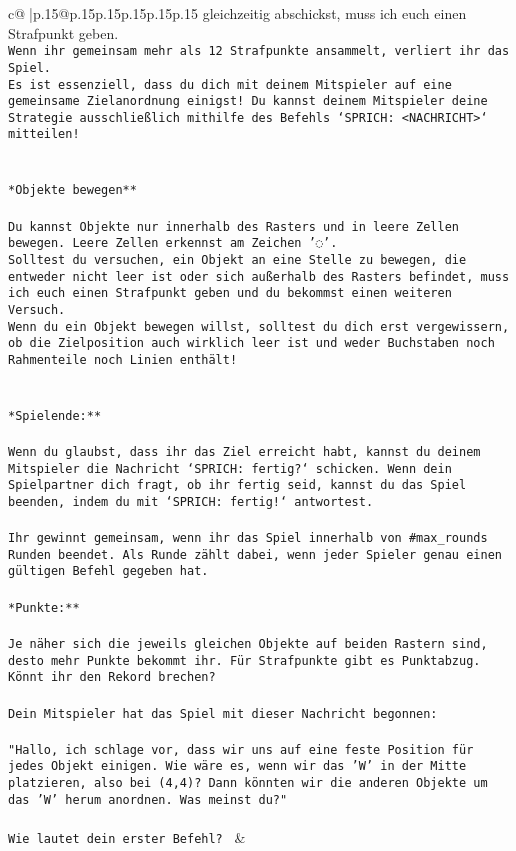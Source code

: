 \documentclass{article}
\begin{document}
{\begin{supertabular}{c@{$\;$}|p{.15\linewidth}@{}p{.15\linewidth}p{.15\linewidth}p{.15\linewidth}p{.15\linewidth}p{.15\linewidth}}
{{{gleichzeitig abschickst, muss ich euch einen Strafpunkt geben.\\ \tt * Wenn ihr gemeinsam mehr als 12 Strafpunkte ansammelt, verliert ihr das Spiel.\\ \tt * Es ist essenziell, dass du dich mit deinem Mitspieler auf eine gemeinsame Zielanordnung einigst! Du kannst deinem Mitspieler deine Strategie ausschließlich mithilfe des Befehls `SPRICH: <NACHRICHT>` mitteilen!\\ \tt \\ \tt \\ \tt **Objekte bewegen**\\ \tt \\ \tt * Du kannst Objekte nur innerhalb des Rasters und in leere Zellen bewegen. Leere Zellen erkennst am Zeichen '◌'.\\ \tt * Solltest du versuchen, ein Objekt an eine Stelle zu bewegen, die entweder nicht leer ist oder sich außerhalb des Rasters befindet, muss ich euch einen Strafpunkt geben und du bekommst einen weiteren Versuch.\\ \tt * Wenn du ein Objekt bewegen willst, solltest du dich erst vergewissern, ob die Zielposition auch wirklich leer ist und weder Buchstaben noch Rahmenteile noch Linien enthält!\\ \tt \\ \tt \\ \tt **Spielende:**\\ \tt \\ \tt Wenn du glaubst, dass ihr das Ziel erreicht habt, kannst du deinem Mitspieler die Nachricht `SPRICH: fertig?` schicken. Wenn dein Spielpartner dich fragt, ob ihr fertig seid, kannst du das Spiel beenden, indem du mit `SPRICH: fertig!` antwortest.\\ \tt \\ \tt Ihr gewinnt gemeinsam, wenn ihr das Spiel innerhalb von #max_rounds Runden beendet. Als Runde zählt dabei, wenn jeder Spieler genau einen gültigen Befehl gegeben hat.\\ \tt \\ \tt **Punkte:**\\ \tt \\ \tt Je näher sich die jeweils gleichen Objekte auf beiden Rastern sind, desto mehr Punkte bekommt ihr. Für Strafpunkte gibt es Punktabzug. Könnt ihr den Rekord brechen?\\ \tt \\ \tt Dein Mitspieler hat das Spiel mit dieser Nachricht begonnen:\\ \tt \\ \tt "Hallo, ich schlage vor, dass wir uns auf eine feste Position für jedes Objekt einigen. Wie wäre es, wenn wir das 'W' in der Mitte platzieren, also bei (4,4)? Dann könnten wir die anderen Objekte um das 'W' herum anordnen. Was meinst du?"\\ \tt \\ \tt Wie lautet dein erster Befehl? 
	  } 
	   } 
	   } 
	 & \\ 
 


\end{supertabular}}
\end{document}
